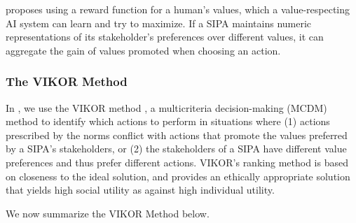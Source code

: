 \citet{Sotala2017HumanValues} proposes using a reward function for a
human's values, which a value-respecting AI system can learn and try to
maximize. If a SIPA maintains numeric representations of its
stakeholder's preferences over different values, it can aggregate the gain
of values promoted when choosing an action.

\subsubsection{The VIKOR Method}


In \frameworkAinur, we use the VIKOR
method \citep{opricovic2004compromise}, a multicriteria decision-making (MCDM) method to identify which
actions to perform in situations where (1) actions prescribed by the norms
conflict with actions that promote the values preferred by a SIPA's
stakeholders, or (2) the stakeholders of a SIPA have different value
preferences and thus prefer different actions.
VIKOR's ranking method is based on closeness to the ideal solution, and provides an ethically appropriate solution that yields high social utility as against high individual utility.

We now summarize the VIKOR Method  \citep{opricovic2004compromise} below. 


